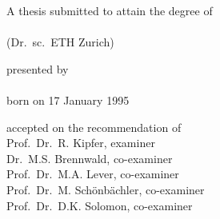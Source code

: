 \begin{titlepage}
    \begin{center}
        \large
        \begingroup
        \endgroup

        \hfill

        \vfill

        \begingroup
            \spacedallcaps{\myTitle}
        \endgroup

        \vfill

        \begingroup
            A thesis submitted to attain the degree of\\
            \vspace{0.5em}
            \\
            (Dr.\ sc.\ ETH Zurich)
        \endgroup

        \vfill

        \begingroup
            presented by\\
            \vspace{2em}
            \spacedlowsmallcaps{\myName}\\
            \vspace{2em}
            born on 17 January 1995\\
        \endgroup

        \vfill

        \begingroup
            accepted on the recommendation of\\
            \vspace{1em}
            Prof.\ Dr.\ R. Kipfer, examiner\\
            Dr.\ M.S. Brennwald, co-examiner\\
            Prof.\ Dr.\ M.A. Lever, co-examiner\\
            Prof.\ Dr.\ M. Schönbächler, co-examiner\\
            Prof.\ Dr.\ D.K. Solomon, co-examiner
        \endgroup

        \vfill

        \myTime%

        \vfill
    \end{center}
\end{titlepage}
